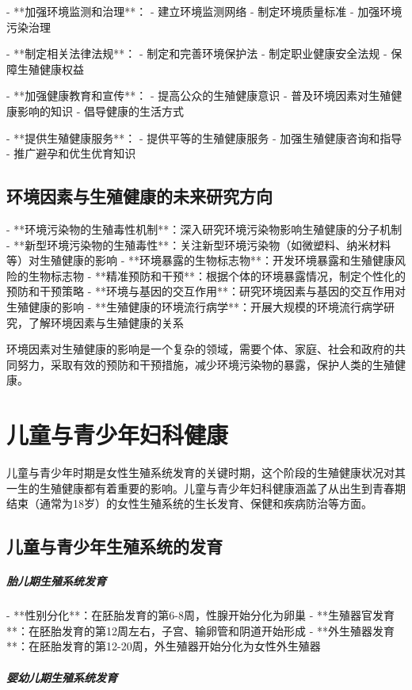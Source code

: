 \begin{enumerate}
- **加强环境监测和治理**：
  - 建立环境监测网络
  - 制定环境质量标准
  - 加强环境污染治理

- **制定相关法律法规**：
  - 制定和完善环境保护法
  - 制定职业健康安全法规
  - 保障生殖健康权益

- **加强健康教育和宣传**：
  - 提高公众的生殖健康意识
  - 普及环境因素对生殖健康影响的知识
  - 倡导健康的生活方式

- **提供生殖健康服务**：
  - 提供平等的生殖健康服务
  - 加强生殖健康咨询和指导
  - 推广避孕和优生优育知识

\subsection{环境因素与生殖健康的未来研究方向}

- **环境污染物的生殖毒性机制**：深入研究环境污染物影响生殖健康的分子机制
- **新型环境污染物的生殖毒性**：关注新型环境污染物（如微塑料、纳米材料等）对生殖健康的影响
- **环境暴露的生物标志物**：开发环境暴露和生殖健康风险的生物标志物
- **精准预防和干预**：根据个体的环境暴露情况，制定个性化的预防和干预策略
- **环境与基因的交互作用**：研究环境因素与基因的交互作用对生殖健康的影响
- **生殖健康的环境流行病学**：开展大规模的环境流行病学研究，了解环境因素与生殖健康的关系

环境因素对生殖健康的影响是一个复杂的领域，需要个体、家庭、社会和政府的共同努力，采取有效的预防和干预措施，减少环境污染物的暴露，保护人类的生殖健康。

\section{儿童与青少年妇科健康}

儿童与青少年时期是女性生殖系统发育的关键时期，这个阶段的生殖健康状况对其一生的生殖健康都有着重要的影响。儿童与青少年妇科健康涵盖了从出生到青春期结束（通常为18岁）的女性生殖系统的生长发育、保健和疾病防治等方面。

\subsection{儿童与青少年生殖系统的发育}

\subparagraph{胎儿期生殖系统发育}

- **性别分化**：在胚胎发育的第6-8周，性腺开始分化为卵巢
- **生殖器官发育**：在胚胎发育的第12周左右，子宫、输卵管和阴道开始形成
- **外生殖器发育**：在胚胎发育的第12-20周，外生殖器开始分化为女性外生殖器

\subparagraph{婴幼儿期生殖系统发育}


\end{enumerate}
